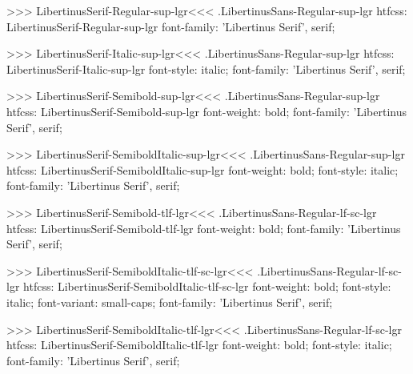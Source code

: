 >>>
\<LibertinusSerif-Regular-sup-lgr\><<<
.LibertinusSans-Regular-sup-lgr
htfcss:  LibertinusSerif-Regular-sup-lgr  font-family: 'Libertinus Serif', serif;

>>>
\<LibertinusSerif-Italic-sup-lgr\><<<
.LibertinusSans-Regular-sup-lgr
htfcss:  LibertinusSerif-Italic-sup-lgr  font-style: italic; font-family: 'Libertinus Serif', serif;

>>>
\<LibertinusSerif-Semibold-sup-lgr\><<<
.LibertinusSans-Regular-sup-lgr
htfcss:  LibertinusSerif-Semibold-sup-lgr  font-weight: bold; font-family: 'Libertinus Serif', serif;

>>>
\<LibertinusSerif-SemiboldItalic-sup-lgr\><<<
.LibertinusSans-Regular-sup-lgr
htfcss:  LibertinusSerif-SemiboldItalic-sup-lgr  font-weight: bold; font-style: italic; font-family: 'Libertinus Serif', serif;

>>>
\<LibertinusSerif-Semibold-tlf-lgr\><<<
.LibertinusSans-Regular-lf-sc-lgr
htfcss:  LibertinusSerif-Semibold-tlf-lgr  font-weight: bold; font-family: 'Libertinus Serif', serif;

>>>
\<LibertinusSerif-SemiboldItalic-tlf-sc-lgr\><<<
.LibertinusSans-Regular-lf-sc-lgr
htfcss:  LibertinusSerif-SemiboldItalic-tlf-sc-lgr  font-weight: bold; font-style: italic; font-variant: small-caps; font-family: 'Libertinus Serif', serif;

>>>
\<LibertinusSerif-SemiboldItalic-tlf-lgr\><<<
.LibertinusSans-Regular-lf-sc-lgr
htfcss:  LibertinusSerif-SemiboldItalic-tlf-lgr  font-weight: bold; font-style: italic; font-family: 'Libertinus Serif', serif;

